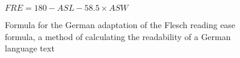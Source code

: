 \begin{figure}
	\caption[Flesch Reading Ease Formula]{Formula for the German adaptation of the Flesch reading ease formula, a method of calculating the readability of a German language text}
	\label{fig:fre}
	\begin{center}
		\begin{math}
		FRE = 180 - ASL - 58.5 \times ASW
		\end{math}
	\end{center}
\end{figure}